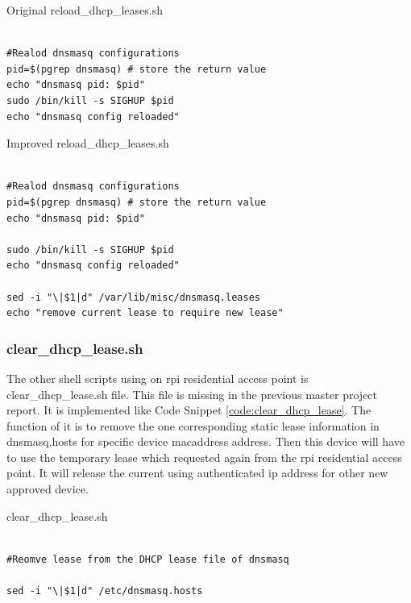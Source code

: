 \begin{algorithm}[h]
  \caption{Original reload\_dhcp\_leases.sh}
  \label{code:origin_reload_dhcp_leases}
  \begin{verbatim}
  
#Realod dnsmasq configurations
pid=$(pgrep dnsmasq) # store the return value
echo "dnsmasq pid: $pid"
sudo /bin/kill -s SIGHUP $pid
echo "dnsmasq config reloaded"
 \end{verbatim}
\end{algorithm}

\begin{algorithm}[h]
  \caption{Improved reload\_dhcp\_leases.sh}
  \label{code:reload_dhcp_leases}
  \begin{verbatim}
  
#Realod dnsmasq configurations
pid=$(pgrep dnsmasq) # store the return value
echo "dnsmasq pid: $pid"

sudo /bin/kill -s SIGHUP $pid
echo "dnsmasq config reloaded"

sed -i "\|$1|d" /var/lib/misc/dnsmasq.leases
echo "remove current lease to require new lease"
 \end{verbatim}
\end{algorithm}

\subsubsection{clear\_dhcp\_lease.sh}
\par The other shell scripts using on \gls{rpi} residential access point is clear\_dhcp\_lease.sh file. This file is missing in the previous master project report. It is implemented like Code Snippet \ref{code:clear_dhcp_lease}. The function of it is to remove the one corresponding static lease information in dnsmasq.hosts for specific device \gls{macaddress} address. Then this device will have to use the temporary lease which requested again from the \gls{rpi} residential access point. It will release the current using authenticated \gls{ip} address for other new approved device.

\begin{algorithm}[h]
  \caption{clear\_dhcp\_lease.sh}
  \label{code:clear_dhcp_lease}
  \begin{verbatim}
  
#Reomve lease from the DHCP lease file of dnsmasq

sed -i "\|$1|d" /etc/dnsmasq.hosts
 \end{verbatim}
\end{algorithm}

